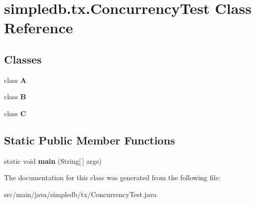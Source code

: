 \hypertarget{classsimpledb_1_1tx_1_1ConcurrencyTest}{}\section{simpledb.\+tx.\+Concurrency\+Test Class Reference}
\label{classsimpledb_1_1tx_1_1ConcurrencyTest}
\subsection*{Classes}
\begin{DoxyCompactItemize}
\item 
class {\bfseries A}
\item 
class {\bfseries B}
\item 
class {\bfseries C}
\end{DoxyCompactItemize}
\subsection*{Static Public Member Functions}
\begin{DoxyCompactItemize}
\item 
\mbox{\label{classsimpledb_1_1tx_1_1ConcurrencyTest_a862f146df2c28effe0c6a5efb5bf3eaa}} 
static void {\bfseries main} (String\mbox{[}$\,$\mbox{]} args)
\end{DoxyCompactItemize}


The documentation for this class was generated from the following file\+:\begin{DoxyCompactItemize}
\item 
src/main/java/simpledb/tx/Concurrency\+Test.\+java\end{DoxyCompactItemize}
